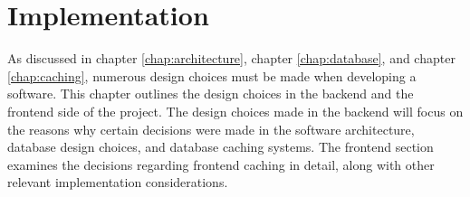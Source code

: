 \chapter{Implementation}\label{text}
As discussed in chapter \ref{chap:architecture}, chapter \ref{chap:database}, and chapter \ref{chap:caching}, numerous design choices must be made when developing a software. This chapter 
outlines the design choices in the backend and the frontend side of the project. The design choices 
made in the backend will focus on the reasons why certain decisions were made in the software architecture, database design choices, and database caching systems.
The frontend section examines the decisions regarding frontend caching in detail, along with other relevant implementation considerations.


